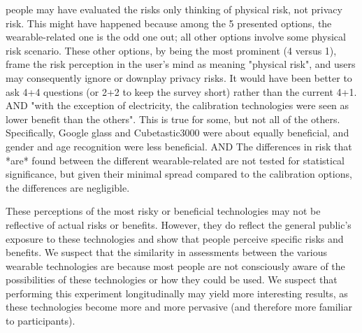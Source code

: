 {\color {red} people may have evaluated the risks only thinking of physical risk, not privacy risk. This might have happened because among the 5 presented options, the wearable-related one is the odd one out; all other options involve some physical risk scenario. These other options, by being the most prominent (4 versus 1), frame the risk perception in the user's mind as meaning "physical risk", and users may consequently ignore or downplay privacy risks. It would have been better to ask 4+4  questions (or 2+2 to keep the survey short) rather than the current 4+1. AND "with the exception of electricity, the calibration technologies were seen as lower benefit than the others". This is true for some, but not all of the others. Specifically, Google glass and Cubetastic3000 were about equally beneficial, and gender and age recognition were less beneficial. AND The differences in risk that *are* found between the different wearable-related are not tested for statistical significance, but given their minimal spread compared to the calibration options, the differences are negligible.}

These perceptions of the most risky or beneficial technologies may not be reflective of actual risks or benefits. However, they do reflect the general public's exposure to these technologies and show that people perceive specific risks and benefits. We suspect that the similarity in assessments between the various wearable technologies are because most people are not consciously aware of the possibilities of these technologies or how they could be used. We suspect that performing this experiment longitudinally may yield more interesting results, as these technologies become more and more pervasive (and therefore more familiar to participants).